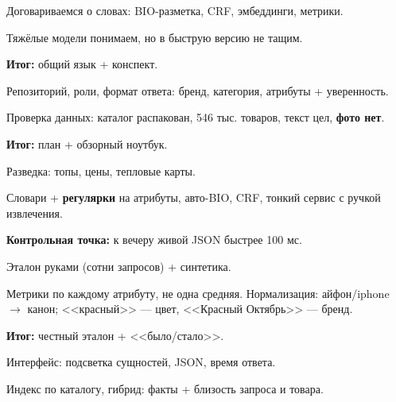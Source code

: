 \documentclass[11pt,a4paper]{article}
\begin{document}
\begin{landscape}
\begin{tcbraster}[raster columns=6, raster column skip=4pt, raster equal height,
  enhanced, colframe=rulec, boxrule=0.6pt, arc=1.5pt,
  left=4pt, right=4pt, top=3pt, bottom=3pt, colback=white]
\begin{tcolorbox}[colbacktitle=slate, title={\scriptsize\bfseries 0 $\cdot$ ТЕОРИЯ}]
\tiny
Договариваемся о словах: BIO-разметка, CRF, эмбеддинги, метрики.\par\vspace{2pt}
Тяжёлые модели понимаем, но в быструю версию не тащим.\par\vspace{2pt}
\textbf{Итог:} общий язык + конспект.
\end{tcolorbox}%
\begin{tcolorbox}[colbacktitle=slate, title={\scriptsize\bfseries 1 $\cdot$ КАРКАС}]
\tiny
Репозиторий, роли, формат ответа: бренд, категория, атрибуты + уверенность.\par\vspace{2pt}
Проверка данных: каталог распакован, 546 тыс. товаров, текст цел, \textbf{фото нет}.\par\vspace{2pt}
\textbf{Итог:} план + обзорный ноутбук.
\end{tcolorbox}%
\begin{tcolorbox}[colbacktitle=mvred, title={\scriptsize\bfseries 2 $\cdot$ ДАННЫЕ + ВЕРСИЯ}]
\tiny
Разведка: топы, цены, тепловые карты.\par\vspace{2pt}
Словари + \textbf{регулярки} на атрибуты, авто-BIO, CRF, тонкий сервис с ручкой извлечения.\par\vspace{2pt}
\textbf{Контрольная точка:} к вечеру живой JSON быстрее 100 мс.
\end{tcolorbox}%
\begin{tcolorbox}[colbacktitle=slate, title={\scriptsize\bfseries 3 $\cdot$ РАЗМЕТКА}]
\tiny
Эталон руками (сотни запросов) + синтетика.\par\vspace{2pt}
Метрики по каждому атрибуту, не одна средняя. Нормализация: айфон/iphone $\to$ канон; <<красный>> --- цвет, <<Красный Октябрь>> --- бренд.\par\vspace{2pt}
\textbf{Итог:} честный эталон + <<было/стало>>.
\end{tcolorbox}%
\begin{tcolorbox}[colbacktitle=slate, title={\scriptsize\bfseries 4 $\cdot$ ПОИСК}]
\tiny
Интерфейс: подсветка сущностей, JSON, время ответа.\par\vspace{2pt}
Индекс по каталогу, гибрид: факты + близость запроса и товара.\par\vspace{2pt}

\end{tcolorbox}
\end{tcbraster}
\end{landscape}
\end{document}
